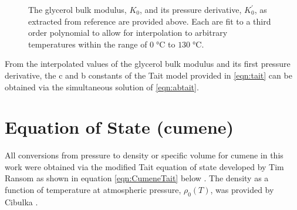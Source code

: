 \begin{figure}[H]
\centering
{}
\caption{The glycerol bulk modulus, $K_0$, and its pressure derivative, $K_{0}^{'}$, as extracted from reference \cite{Cook2} are provided above.  Each are fit to a third order polynomial to allow for interpolation to arbitrary temperatures within the range of $0\;\si{\degreeCelsius}$ to $130\;\si{\degreeCelsius}$. }
\label{figure:GlycerolBulkMod}
\end{figure}
From the interpolated values of the glycerol bulk modulus and its first pressure derivative, the c and b constants of the Tait model provided in \eqn \ref{eqn:tait} can be obtained via the simultaneous solution of \eqn \ref{eqn:abtait}.

\chapter{Equation of State (cumene)} \label{app:CumeneEOS}
All conversions from pressure to density or specific volume for cumene in this work were obtained via the modified Tait equation of state developed by Tim Ransom as shown in equation \ref{eqn:CumeneTait} below \cite{RansomPRL}. The density as a function of temperature at atmospheric pressure, $\rho_{0}(T)$, was provided by Cibulka \cite{Cibulka}.

